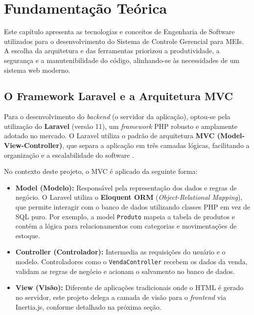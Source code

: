 
\chapter{Fundamentação Teórica}
\label{cap:fundamentacao}

Este capítulo apresenta as tecnologias e conceitos de Engenharia de Software utilizados para o desenvolvimento do Sistema de Controle Gerencial para MEIs. A escolha da arquitetura e das ferramentas priorizou a produtividade, a segurança e a manutenibilidade do código, alinhando-se às necessidades de um sistema web moderno.

\section{O Framework Laravel e a Arquitetura MVC}
\label{sec:laravel}

Para o desenvolvimento do \textit{backend} (o servidor da aplicação), optou-se pela utilização do \textbf{Laravel} (versão 11), um \textit{framework} PHP robusto e amplamente adotado no mercado. O Laravel utiliza o padrão de arquitetura \textbf{MVC (Model-View-Controller)}, que separa a aplicação em três camadas lógicas, facilitando a organização e a escalabilidade do software \cite{laravel2025}.

No contexto deste projeto, o MVC é aplicado da seguinte forma:

\begin{itemize}
    \item \textbf{Model (Modelo):} Responsável pela representação dos dados e regras de negócio. O Laravel utiliza o \textbf{Eloquent ORM} (\textit{Object-Relational Mapping}), que permite interagir com o banco de dados utilizando classes PHP em vez de SQL puro. Por exemplo, a model \texttt{Produto} mapeia a tabela de produtos e contém a lógica para relacionamentos com categorias e movimentações de estoque.
    
    \item \textbf{Controller (Controlador):} Intermedia as requisições do usuário e o modelo. Controladores como o \texttt{VendaController} recebem os dados da venda, validam as regras de negócio e acionam o salvamento no banco de dados.
    
    \item \textbf{View (Visão):} Diferente de aplicações tradicionais onde o HTML é gerado no servidor, este projeto delega a camada de visão para o \textit{frontend} via Inertia.js, conforme detalhado na próxima seção.
\end{itemize}

